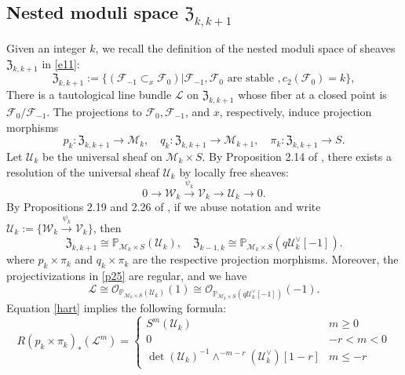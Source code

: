 \documentclass{amsart}
\numberwithin{equation}{section}
\newcommand\mc{\mathcal}
\newcommand\mf{\mathfrak}
\newcommand\mb{\mathbb}
\theoremstyle{definition}
\theoremstyle{remark}
\begin{document}
\subsection{Nested moduli space $\mf{Z}_{k,k+1}$} Given an integer $k$, we recall the definition of the nested moduli space of sheaves $\mf{Z}_{k,k+1}$ in \cref{e11}:
\begin{equation*}
   \mf{Z}_{k,k+1}:=\{(\mc{F}_{-1}\subset_{x} \mc{F}_{0})|\mc{F}_{-1}, \mc{F}_{0} \text{ are stable }, c_{2}(\mc{F}_{0})=k\},
\end{equation*}
There is a tautological line bundle $\mc{L}$ on $\mf{Z}_{k,k+1}$ whose fiber at a closed point is $\mc{F}_0/\mc{F}_{-1}$. The projections to $\mc{F}_{0},\mc{F}_{-1}$, and $x$, respectively, induce projection morphisms
$$p_{k}:\mf{Z}_{k,k+1}\to \mc{M}_{k}, \quad q_{k}:\mf{Z}_{k,k+1}\to \mc{M}_{k+1},\quad \pi_{k}:\mf{Z}_{k,k+1}\to S.$$
Let $\mc{U}_k$ be the universal sheaf on $\mc{M}_{k}\times S$. By Proposition 2.14 of \cite{neguct2018hecke}, there exists a resolution of the universal sheaf $\mc{U}_k$ by locally free sheaves:
\begin{equation*}
        0 \to \mc{W}_{k}\xrightarrow{\psi_{k}}\mc{V}_{k}\to \mc{U}_{k}\to 0.
  \end{equation*}
By Propositions 2.19 and 2.26 of \cite{neguct2018hecke}, if we abuse notation and write $\mc{U}_{k}:=\{\mc{W}_{k}\xrightarrow{\psi_{k}}\mc{V}_{k}\}$, then 
\begin{equation}
  \label{p25}
    \mf{Z}_{k,k+1}\cong \mb{P}_{\mc{M}_{k}\times S}(\mc{U}_{k}),\quad \mf{Z}_{k-1,k}\cong \mb{P}_{\mc{M}_{k}\times S}(q\mc{U}_{k}^{\vee}[-1]).
\end{equation}
where $p_{k}\times \pi_{k}$ and $q_{k}\times \pi_{k}$ are the respective projection morphisms. Moreover, the projectivizations in \cref{p25} are regular, and we have 
 $$\mc{L}\cong \mc{O}_{\mb{P}_{\mc{M}_{k}\times S}(\mc{U}_{k})}(1)\cong \mc{O}_{\mb{P}_{\mc{M}_{k}\times S}(q\mc{U}_{k}^{\vee}[-1])}(-1).$$
Equation \cref{hart} implies the following formula: 
  \begin{equation}
      \label{cor:5.3ext}
     R(p_{k}\times \pi_{k})_{*}(\mc{L}^{m})=
     \begin{cases}
       S^{m}(\mc{U}_{k}) & m\geq 0 \\
       0 & -r<m<0 \\
     \det(\mc{U}_{k})^{-1}\wedge^{-m-r}(\mc{U}_{k}^{\vee})[1-r] & m\leq -r
     \end{cases}
   \end{equation}
\end{document}
